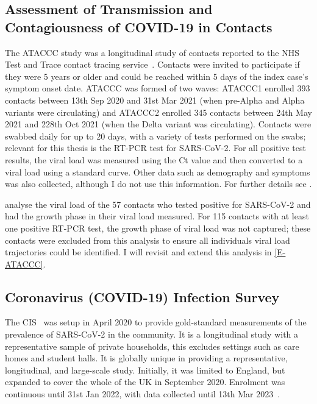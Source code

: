 \documentclass[thesis.tex]{subfiles}
\begin{document}
\subsection{Assessment of Transmission and Contagiousness of COVID-19 in Contacts} \label{biology-data:sec:ataccc}

The ATACCC study was a longitudinal study of contacts reported to the NHS Test and Trace contact tracing service~\autocite{hakkiOnset}.
Contacts were invited to participate if they were 5 years or older and  could be reached within 5 days of the index case's symptom onset date.
ATACCC was formed of two waves: ATACCC1 enrolled 393 contacts between 13th Sep 2020 and 31st Mar 2021 (when pre-Alpha and Alpha variants were circulating) and ATACCC2 enrolled 345 contacts between 24th May 2021 and 228th Oct 2021 (when the Delta variant was circulating).
Contacts were swabbed daily for up to 20 days, with a variety of tests performed on the swabs; relevant for this thesis is the RT-PCR test for SARS-CoV-2.
For all positive test results, the viral load was measured using the Ct value and then converted to a viral load using a standard curve.
Other data such as demography and symptoms was also collected, although I do not use this information.
For further details see \textcite{singanayagamDuration,hakkiOnset}.

\Textcite{hakkiOnset} analyse the viral load of the 57 contacts who tested positive for SARS-CoV-2 and had the growth phase in their viral load measured.
For 115 contacts with at least one positive RT-PCR test, the growth phase of viral load was not captured; these contacts were excluded from this analysis to ensure all individuals viral load trajectories could be identified.
I will revisit and extend this analysis in \cref{E-ATACCC}.

\subsection{Coronavirus (COVID-19) Infection Survey} \label{intro:sec:cis}

The CIS~\autocite{CIS} was setup in April 2020 to provide gold-standard measurements of the prevalence of SARS-CoV-2 in the community.
It is a longitudinal study with a representative sample of private households, this excludes settings such as care homes and student halls.
It is globally unique in providing a representative, longitudinal, and large-scale study.
Initially, it was limited to England, but expanded to cover the whole of the UK in September 2020.
Enrolment was continuous until 31st Jan 2022, with data collected until 13th Mar 2023~\autocite{weiRisk}. 
\end{document}
